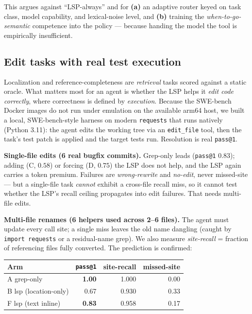 \documentclass[11pt]{article}
\newcommand{\code}[1]{\texttt{#1}}
\begin{document}
This argues against ``LSP-always'' and for \textbf{(a)} an adaptive router keyed on task class, model
capability, and lexical-noise level, and \textbf{(b)} training the \emph{when-to-go-semantic} competence
into the policy --- because handing the model the tool is empirically insufficient.

\subsection{Edit tasks with real test execution}\label{sec:edit}

Localization and reference-completeness are \emph{retrieval} tasks scored against a static oracle. What
matters most for an agent is whether the LSP helps it \emph{edit code correctly}, where correctness is
defined by \emph{execution}. Because the SWE-bench Docker images do not run under emulation on the
available arm64 host, we built a local, SWE-bench-style harness on modern \code{requests} that runs
natively (Python 3.11): the agent edits the working tree via an \code{edit\_file} tool, then the task's
test patch is applied and the target tests run. Resolution is real \code{pass@1}.

\textbf{Single-file edits (6 real bugfix commits).} Grep-only leads (\code{pass@1} $0.83$); adding (C,
$0.58$) or forcing (D, $0.75$) the LSP does not help, and the LSP again carries a token premium.
Failures are \emph{wrong-rewrite} and \emph{no-edit}, never missed-site --- but a single-file task
\emph{cannot} exhibit a cross-file recall miss, so it cannot test whether the LSP's recall ceiling
propagates into edit failures. That needs multi-file edits.

\textbf{Multi-file renames (6 helpers used across 2--6 files).} The agent must update every call site; a
single miss leaves the old name dangling (caught by \code{import requests} or a residual-name grep). We
also measure \emph{site-recall} = fraction of referencing files fully converted. The prediction is
confirmed:

\begin{center}\small
\begin{tabular}{@{}lrrr@{}}
\toprule
Arm & \code{pass@1} & site-recall & missed-site \\
\midrule
A grep-only            & \textbf{1.00} & 1.000 & 0.00 \\
B lsp (location-only)  & 0.67 & 0.930 & 0.33 \\
F lsp (text inline)    & \textbf{0.83} & 0.958 & 0.17 \\
\bottomrule
\end{tabular}
\end{center}
\end{document}
